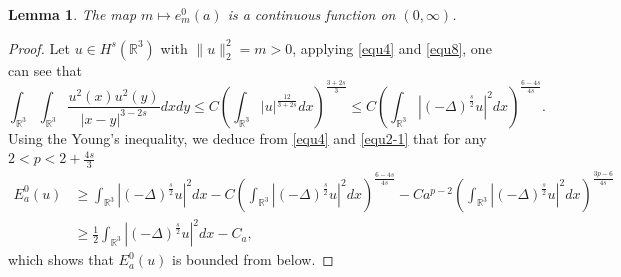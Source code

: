 \documentclass[reqno, 11pt]{amsart} %
\numberwithin{equation}{section}
\newtheorem{lemma}[theorem]{Lemma}
\begin{document}
	
	\begin{lemma}\label{lem2-1}
		The map $m\mapsto e^{0}_{m}(a)$ is a continuous function on $\left( 0, \infty\right) $.
	\end{lemma}
	\begin{proof}
		Let $u\in H^{s}(\mathbb{R}^{3})$ with $\|u\|_{2}^{2}=m>0$, applying \eqref{equ4} and \eqref{equ8}, one can see that
		\begin{equation}\label{equ2-1}
			\int_{\mathbb{R}^{3}}\int_{\mathbb{R}^{3}}\frac{u^{2}(x)u^{2}(y)}{|x-y|^{3-2s}}dxdy\leq C\left(\int_{\mathbb{R}^{3}}|u|^{\frac{12}{3+2s}}dx\right)^{\frac{3+2s}{3}}\leq C\left(\int_{\mathbb{R}^{3}}|(-\Delta)^{\frac{s}{2}} u|^{2}dx\right)^{\frac{6-4s}{4s}}.
		\end{equation} 
		Using the Young’s inequality, we deduce from \eqref{equ4} and \eqref{equ2-1} that for any $2<p<2+\frac{4s}{3}$
		\begin{equation}\label{equ2-2}
			\begin{split}
				E^{0}_{a}(u)&\geq\int_{\mathbb{R}^{3}}|(-\Delta)^{\frac{s}{2}} u|^{2}dx-C\left(\int_{\mathbb{R}^{3}}|(-\Delta)^{\frac{s}{2}} u|^{2}dx\right)^{\frac{6-4s}{4s}}-Ca^{p-2}\left(\int_{\mathbb{R}^{3}}|(-\Delta)^{\frac{s}{2}} u|^{2}dx\right)^{\frac{3p-6}{4s}}\\
				&\geq\frac{1}{2} \int_{\mathbb{R}^{3}}|(-\Delta)^{\frac{s}{2}} u|^{2}dx-C_{a},
			\end{split}
		\end{equation}
		which shows that $E^{0}_{a}(u)$ is bounded from below.
		

\end{proof}
\end{document}
